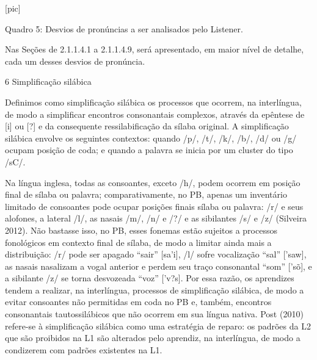 {[}pic{]}

   Quadro 5: Desvios de pron\'uncias a ser analisados pelo Listener.

Nas Se\c{c}\~oes de 2.1.1.4.1 a 2.1.1.4.9, ser\'a apresentado, em maior n\'ivel de
detalhe, cada um desses desvios de pron\'uncia.

6 Simplifica\c{c}\~ao sil\'abica

Definimos como simplifica\c{c}\~ao sil\'abica os processos que ocorrem, na
interl\'ingua, de modo a simplificar encontros consonantais complexos,
atrav\'es da ep\^entese de {[}i{]} ou {[}?{]} e da consequente
ressilabifica\c{c}\~ao da s\'ilaba original. A simplifica\c{c}\~ao sil\'abica envolve os
seguintes contextos: quando /p/, /t/, /k/, /b/, /d/ ou /g/ ocupam
posi\c{c}\~ao de coda; e quando a palavra se inicia por um cluster do tipo
/sC/.

Na l\'ingua inglesa, todas as consoantes, exceto /h/, podem ocorrem em
posi\c{c}\~ao final de s\'ilaba ou palavra; comparativamente, no PB, apenas um
invent\'ario limitado de consoantes pode ocupar posi\c{c}\~oes finais s\'ilaba ou
palavra: /r/ e seus alofones, a lateral /l/, as nasais /m/, /n/ e /?/ e
as sibilantes /s/ e /z/ (Silveira 2012). N\~ao bastasse isso, no PB, esses
fonemas est\~ao sujeitos a processos fonol\'ogicos em contexto final de
s\'ilaba, de modo a limitar ainda mais a distribui\c{c}\~ao: /r/ pode ser
apagado ``sair'' {[}sa'i{]}, /l/ sofre vocaliza\c{c}\~ao ``sal'' {[}'saw{]},
as nasais nasalizam a vogal anterior e perdem seu tra\c{c}o consonantal
``som'' {[}'s\~o{]}, e a sibilante /z/ se torna desvozeada ``voz''
{[}'v?s{]}. Por essa raz\~ao, os aprendizes tendem a realizar, na
interl\'ingua, processos de simplifica\c{c}\~ao sil\'abica, de modo a evitar
consoantes n\~ao permitidas em coda no PB e, tamb\'em, encontros
consonantais tautossil\'abicos que n\~ao ocorrem em sua l\'ingua nativa. Post
(2010) refere-se à simplifica\c{c}\~ao sil\'abica como uma estrat\'egia de reparo:
os padr\~oes da L2 que s\~ao proibidos na L1 s\~ao alterados pelo aprendiz, na
interl\'ingua, de modo a condizerem com padr\~oes existentes na L1.

